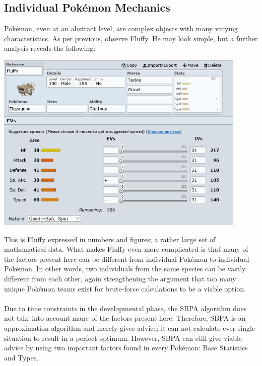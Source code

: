 \documentclass{article}
\begin{document}
\subsection{Individual Pok\'emon Mechanics}
Pok\'emon, even at an abstract level, are complex objects with many varying characteristics. As per previous, observe Fluffy. He may look simple, but a further analysis reveals the following:
\begin{center}
	\includegraphics[width=0.9\textwidth]{fluffyfile.png}
\end{center}
This is Fluffy expressed in numbers and figures; a rather large set of mathematical data. What makes Fluffy even more complicated is that many of the factors present here can be different from individual Pok\'emon to individual Pok\'emon. In other words, two individuals from the same species can be vastly different from each other, again strengthening the argument that too many unique Pok\'emon teams exist for brute-force calculations to be a viable option.\\\\
Due to time constraints in the developmental phase, the SBPA algorithm does not take into account many of the factors present here. Therefore, SBPA is an approximation algorithm and merely gives advice; it can not calculate ever single situation to result in a perfect optimum. However, SBPA can still give viable advice by using two important factors found in every Pok\'emon: Base Statistics and Types.
\end{document}
